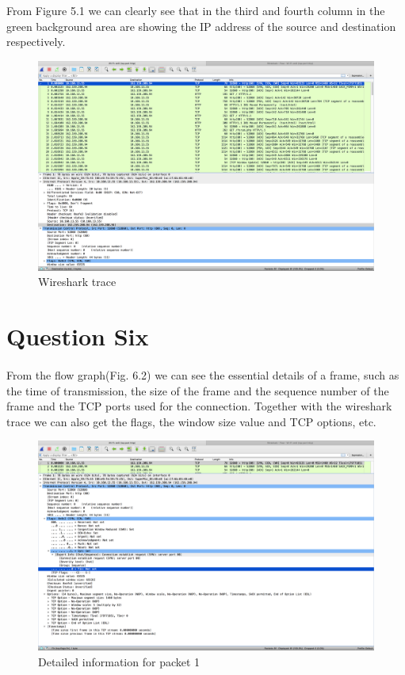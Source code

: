 \documentclass[paper=a4, fontsize=11pt]{scrartcl} %
\numberwithin{equation}{section} %
\numberwithin{figure}{section} %
\numberwithin{table}{section} %
\begin{document}
From Figure 5.1 we can clearly see that in the third and fourth column in the green background area are showing the IP address of the source and destination respectively.
\begin{figure}[htbp!]
		\centering
		\includegraphics[width=1.0\textwidth]{assigment_1_pics/1}
		\caption{Wireshark trace}%
		\vspace{-1em}
\end{figure}



\section{Question Six}
\paragraph{ }

From the flow graph(Fig. 6.2) we can see the essential details of a frame, such as the time of transmission, the size of the frame and the sequence number of the frame and the TCP ports used for the connection. Together with the wireshark trace we can also get the flags,  the window size value and TCP options, etc.
\begin{figure}[htbp!]
		\centering
		\includegraphics[width=1.0\textwidth]{assigment_1_pics/3}
		\caption{Detailed information for packet 1}%
		\vspace{-1em}
\end{figure}
\end{document}

